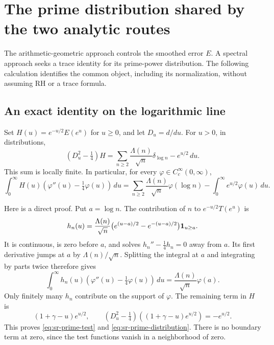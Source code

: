 \section{The prime distribution shared by the two analytic routes}
\label{sec:sr-shared-distribution}
The arithmetic-geometric approach controls the smoothed error \(E\).
A spectral approach seeks a trace identity for its prime-power
distribution. The following calculation identifies the common object,
including its normalization, without assuming RH or a trace formula.

\subsection{An exact identity on the logarithmic line}
Set \(H(u)=e^{-u/2}E(e^u)\) for \(u\geq0\), and let \(D_u=d/du\).
For \(u>0\), in distributions,
\begin{equation}\label{eq:sr-prime-distribution}
 (D_u^2-\tfrac14)H
  =\sum_{n\geq2}\frac{\Lambda(n)}{\sqrt n}\delta_{\log n}
          -e^{u/2}\,du .
\end{equation}
This sum is locally finite. In particular, for every
\(\varphi\in C_c^\infty(0,\infty)\),
\begin{equation}\label{eq:sr-prime-test}
 \int_0^\infty H(u)(\varphi''(u)-\tfrac14\varphi(u))\,du
 =\sum_{n\geq2}\frac{\Lambda(n)}{\sqrt n}\varphi(\log n)
       -\int_0^\infty e^{u/2}\varphi(u)\,du.
\end{equation}

Here is a direct proof. Put \(a=\log n\). The contribution of \(n\)
to \(e^{-u/2}T(e^u)\) is
\[
 h_n(u)=\frac{\Lambda(n)}{\sqrt n}
 \bigl(e^{(u-a)/2}-e^{-(u-a)/2}\bigr){\bf1}_{u\geq a}.
\]
It is continuous, is zero before \(a\), and solves
\(h_n''-\tfrac14 h_n=0\) away from \(a\).
Its first derivative jumps at \(a\) by \(\Lambda(n)/\sqrt n\).
Splitting the integral at \(a\) and integrating by parts twice
therefore gives
\[
 \int_0^\infty h_n(u)(\varphi''(u)-\tfrac14\varphi(u))\,du
       =\frac{\Lambda(n)}{\sqrt n}\varphi(a).
\]
Only finitely many \(h_n\) contribute on the support of \(\varphi\).
The remaining term in \(H\) is
\[
 (1+\gamma-u)e^{u/2},\qquad
 (D_u^2-\tfrac14)((1+\gamma-u)e^{u/2})=-e^{u/2}.
\]
This proves \eqref{eq:sr-prime-test} and
\eqref{eq:sr-prime-distribution}. There is no boundary term at zero,
since the test functions vanish in a neighborhood of zero.

